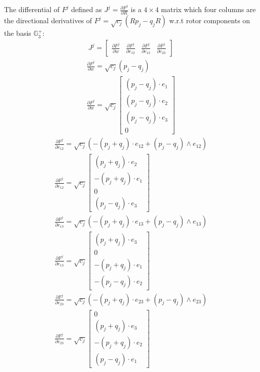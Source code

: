 \documentclass{birkjour}
\numberwithin{equation}{section}
\begin{document}
The differential of $F^j$ defined as $J^j = \frac{\partial F^j}{\partial R}$ is a $4\times4$ matrix which four columns are the directional derivatives of $F^j = \sqrt{c_j} (R p_j - q_j R)$ w.r.t rotor components on the basis $\mathbb{G}^{+}_3$:
\begin{eqnarray*}
J^j = \left[\begin{array}{cccc}\frac{\partial F^j}{\partial w} & \frac{\partial F^j}{\partial e_{12}} & \frac{\partial F^j}{\partial e_{13}} & \frac{\partial F^j}{\partial e_{23}}\end{array}\right]
\end{eqnarray*}
\begin{eqnarray*}
\frac{\partial F^j}{\partial w} = \sqrt{c_j} (p_j - q_j)\\
\frac{\partial F^j}{\partial w} = \sqrt{c_j}
\left[\begin{array}{c}(p_j - q_j) \cdot e_1 \\ (p_j - q_j) \cdot e_2 \\ (p_j - q_j) \cdot e_3 \\ 0\end{array}\right]
\end{eqnarray*}
\begin{eqnarray*}
\frac{\partial F^j}{\partial e_{12}} = \sqrt{c_j} (-(p_j+q_j) \cdot e_{12} + (p_j-q_j) \wedge e_{12})\\
\frac{\partial F^j}{\partial e_{12}} = \sqrt{c_j}
\left[\begin{array}{c}(p_j + q_j) \cdot e_2 \\ -(p_j + q_j) \cdot e_1 \\ 0 \\ (p_j - q_j) \cdot e_3\end{array}\right]
\end{eqnarray*}
\begin{eqnarray*}
\frac{\partial F^j}{\partial e_{13}} = \sqrt{c_j} (-(p_j  + q_j) \cdot e_{13} + (p_j - q_j) \wedge e_{13})\\
\frac{\partial F^j}{\partial e_{13}} = \sqrt{c_j}
\left[\begin{array}{c}(p_j  + q_j) \cdot e_3 \\ 0 \\ -(p_j  + q_j) \cdot e_1 \\ -(p_j - q_j) \cdot e_2\end{array}\right]
\end{eqnarray*}
\begin{eqnarray*}
\frac{\partial F^j}{\partial e_{23}} = \sqrt{c_j} (-(p_j + q_j) \cdot e_{23} + (p_j - q_j) \wedge e_{23})\\
\frac{\partial F^j}{\partial e_{23}} = \sqrt{c_j}
\left[\begin{array}{c} 0 \\ (p_j  + q_j) \cdot e_3 \\ -(p_j  + q_j) \cdot e_2 \\ (p_j - q_j) \cdot e_1\end{array}\right]
\end{eqnarray*}
\end{document}

